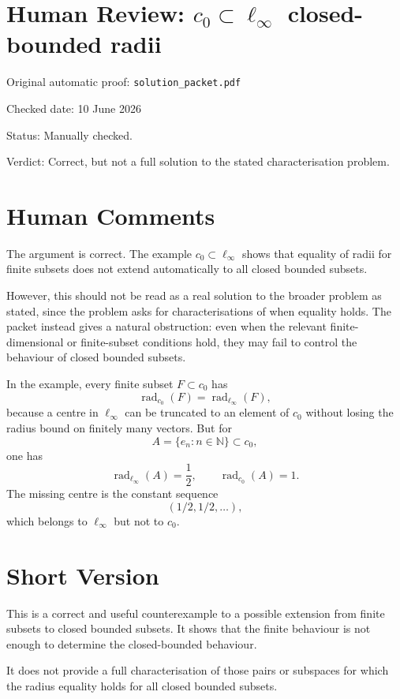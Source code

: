 \documentclass[11pt]{article}
\newcommand{\rad}{\operatorname{rad}}
\begin{document}
\section*{Human Review: \texorpdfstring{$c_0\subset\ell_\infty$}{c0 in ell-infinity} closed-bounded radii}

\noindent Original automatic proof: \texttt{solution\_packet.pdf}

\noindent Checked date: 10 June 2026

\noindent Status: Manually checked.

\noindent Verdict: Correct, but not a full solution to the stated characterisation problem.

\section*{Human Comments}

The argument is correct. The example \(c_0\subset\ell_\infty\) shows that
equality of radii for finite subsets does not extend automatically to all
closed bounded subsets.

However, this should not be read as a real solution to the broader problem as
stated, since the problem asks for characterisations of when equality holds.
The packet instead gives a natural obstruction: even when the relevant
finite-dimensional or finite-subset conditions hold, they may fail to control
the behaviour of closed bounded subsets.

In the example, every finite subset \(F\subset c_0\) has
\[
  \rad_{c_0}(F)=\rad_{\ell_\infty}(F),
\]
because a centre in \(\ell_\infty\) can be truncated to an element of \(c_0\)
without losing the radius bound on finitely many vectors. But for
\[
  A=\{e_n:n\in\mathbb N\}\subset c_0,
\]
one has
\[
  \rad_{\ell_\infty}(A)=\frac12,\qquad \rad_{c_0}(A)=1.
\]
The missing centre is the constant sequence
\[
  (1/2,1/2,\ldots),
\]
which belongs to \(\ell_\infty\) but not to \(c_0\).

\section*{Short Version}

This is a correct and useful counterexample to a possible extension from
finite subsets to closed bounded subsets. It shows that the finite behaviour
is not enough to determine the closed-bounded behaviour.

It does not provide a full characterisation of those pairs or subspaces for
which the radius equality holds for all closed bounded subsets.
\end{document}
